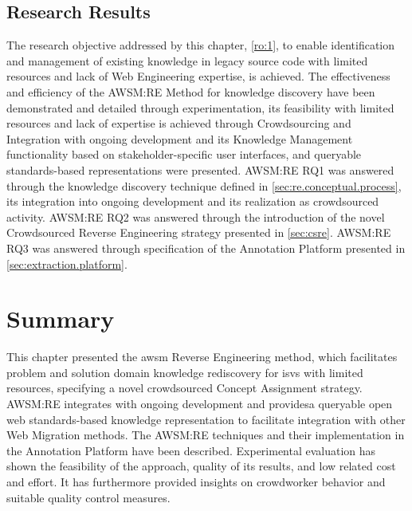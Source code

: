 \hypertarget{sec:re.evaluation.objective}{%
\subsection{Research Results}\label{sec:re.evaluation.objective}}
\vspace{5pt}

The research objective addressed by this chapter, \cref{ro:1}, to enable identification and management of existing knowledge in legacy source code with limited resources and lack of \gls{Web Engineering} expertise, is achieved.
The effectiveness and efficiency of the AWSM:RE Method for knowledge discovery have been demonstrated and detailed through experimentation, its feasibility with limited resources and lack of expertise is achieved through Crowdsourcing and Integration with ongoing development and its Knowledge Management functionality based on stakeholder-specific user interfaces, and queryable standards-based representations were presented.
AWSM:RE RQ1 was answered through the knowledge discovery technique defined in \cref{sec:re.conceptual.process}, its integration into ongoing development and its realization as crowdsourced activity.
AWSM:RE RQ2 was answered through the introduction of the novel Crowdsourced Reverse Engineering strategy presented in \cref{sec:csre}.
AWSM:RE RQ3 was answered through specification of the Annotation Platform  presented in \cref{sec:extraction.platform}.

\vspace{-20pt}
\hypertarget{sec:re.summary}{%
\section{Summary}\label{sec:re.summary}}
\vspace{7pt}

This chapter presented the \gls{awsm} \gls{Reverse Engineering} method, which facilitates problem and solution domain knowledge rediscovery for \glspl{isv} with limited resources, specifying a novel crowdsourced \gls{Concept Assignment} strategy.
AWSM:RE integrates with ongoing development and providesa queryable open \gls{web} standards-based knowledge representation to facilitate integration with other \gls{Web Migration} methods.
The AWSM:RE techniques and their implementation in the Annotation Platform have been described.
Experimental evaluation has shown the feasibility of the approach, quality of its results, and low related cost and effort.
It has furthermore provided insights on crowdworker behavior and suitable quality control measures.